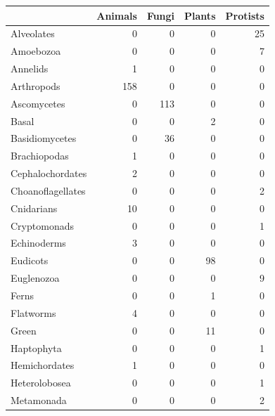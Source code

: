 \documentclass[
  letterpaper,
  DIV=11,
  numbers=noendperiod]{scrreprt}
\newenvironment{Shaded}{}{}
\newcommand{\AttributeTok}[1]{\textcolor[rgb]{0.78,0.47,0.87}{#1}}
\newcommand{\FunctionTok}[1]{\textcolor[rgb]{0.38,0.69,0.94}{#1}}
\newcommand{\NormalTok}[1]{\textcolor[rgb]{0.67,0.70,0.75}{#1}}
\newcommand{\SpecialCharTok}[1]{\textcolor[rgb]{0.34,0.71,0.76}{#1}}
\newcommand{\StringTok}[1]{\textcolor[rgb]{0.60,0.76,0.47}{#1}}
\begin{document}
\begin{Shaded}
\end{Shaded}

\begin{longtable*}[l]{lrrrr}
\toprule
 & Animals & Fungi & Plants & Protists\\
\midrule
Alveolates & 0 & 0 & 0 & 25\\
Amoebozoa & 0 & 0 & 0 & 7\\
Annelids & 1 & 0 & 0 & 0\\
Arthropods & 158 & 0 & 0 & 0\\
Ascomycetes & 0 & 113 & 0 & 0\\
\addlinespace
Basal & 0 & 0 & 2 & 0\\
Basidiomycetes & 0 & 36 & 0 & 0\\
Brachiopodas & 1 & 0 & 0 & 0\\
Cephalochordates & 2 & 0 & 0 & 0\\
Choanoflagellates & 0 & 0 & 0 & 2\\
\addlinespace
Cnidarians & 10 & 0 & 0 & 0\\
Cryptomonads & 0 & 0 & 0 & 1\\
Echinoderms & 3 & 0 & 0 & 0\\
Eudicots & 0 & 0 & 98 & 0\\
Euglenozoa & 0 & 0 & 0 & 9\\
\addlinespace
Ferns & 0 & 0 & 1 & 0\\
Flatworms & 4 & 0 & 0 & 0\\
Green & 0 & 0 & 11 & 0\\
Haptophyta & 0 & 0 & 0 & 1\\
Hemichordates & 1 & 0 & 0 & 0\\
\addlinespace
Heterolobosea & 0 & 0 & 0 & 1\\
Metamonada & 0 & 0 & 0 & 2\\

\end{longtable*}
\end{document}
